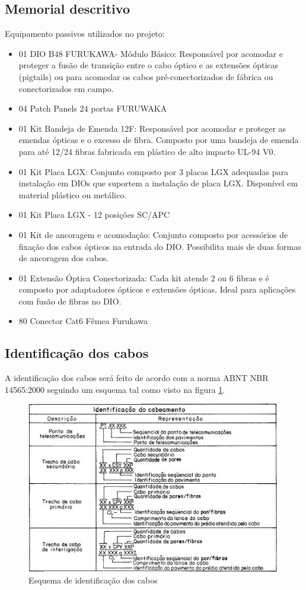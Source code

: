 \documentclass[	DIV=calc,%
							paper=a4,%
							fontsize=12pt,%
							onecolumn]{scrartcl}	 					%
\begin{document}
\subsection{Memorial descritivo}
Equipamento passivos utilizados no projeto:
\begin{itemize}
	\item 01 DIO B48  FURUKAWA- Módulo Básico: Responsável por acomodar e proteger a fusão de transição entre o cabo óptico e as extensões ópticas (pigtails) ou para acomodar os cabos pré-conectorizados de fábrica ou conectorizados em campo.  
	\item 04 Patch Panels 24 portas FURUWAKA
	\item 01 Kit Bandeja de Emenda 12F: Responsável por acomodar e proteger as emendas ópticas e o excesso de fibra. Composto por uma bandeja de emenda para até 12/24 fibras fabricada em plástico de alto impacto UL-94 V0.
	\item 01 Kit Placa LGX: Conjunto composto por 3 placas LGX adequadas para instalação em DIOs que suportem a instalação de placa LGX. Disponível em material plástico ou metálico.
	\item 01 Kit Placa LGX - 12 posições SC/APC
	\item 01 Kit de ancoragem e acomodação: Conjunto composto por acessórios de fixação dos cabos ópticos na entrada do DIO. Possibilita mais de duas formas de ancoragem dos cabos.
	\item 01 Extensão Óptica Conectorizada: Cada kit atende 2 ou 6 fibras e é composto por adaptadores ópticos e extensões ópticas. Ideal para aplicações com fusão de fibras no DIO.
	\item 80 Conector Cat6 Fêmea Furukawa
\end{itemize}

\subsection{Identificação dos cabos}
A identificação dos cabos será feito de acordo com a norma ABNT NBR 14565:2000 seguindo um esquema tal como visto na figura \ref{identificacao}.
\begin{figure}
\centering
\includegraphics[width=\textwidth]{identificacao}
\caption{Esquema de identificação dos cabos}
\label{identificacao}
\end{figure}
\end{document}
